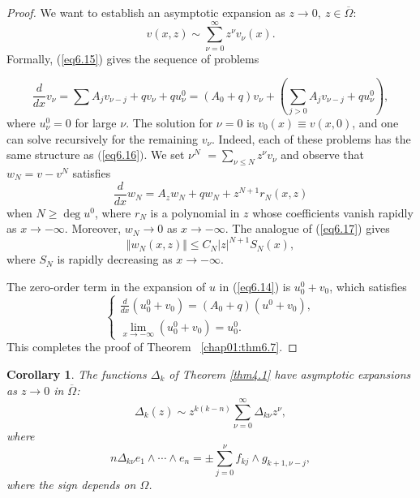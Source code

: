 \documentclass{surv-l}
\theoremstyle{plain}
\newtheorem{cor}[theorem]{Corollary}
\theoremstyle{definition}
\numberwithin{equation}{chapter}
\begin{document}
\begin{proof}
We want to establish an asymptotic expansion as $z\rightarrow 0,\ z\in\overline{\Omega}$:
\begin{equation}\label{eq6.18}
v(x, z)\sim\sum_{\nu=0}^{\infty}z^{\nu}v_{\nu}(x).
\end{equation}
Formally, (\ref{eq6.15}) gives the sequence of problems

\begin{equation}\label{eq6.19}
\displaystyle \frac{d}{dx}v_{\nu}=\sum A_{j}v_{\nu-j}+qv_{\nu} +qu_{\nu}^{0}=(A_{0}+q)v_{\nu}+\left(\sum_{j>0}A_{j}v_{\nu-j}+qu_{\nu}^{0}\right),
\end{equation}
where $u_{\nu}^{0}=0$ for large $\nu$. The solution for $\nu=0$ is
$v_{0}(x)\equiv v(x, 0)$, and one can solve recursively for the
remaining $v_{\nu}$. Indeed, each of these problems has the same
structure as $($\ref{eq6.16}$)$. We set $\nu^{N}$ $=\sum_{\nu\leq N}z^{\nu}v_{\nu}$ and observe that $w_{N}=v-v^{N}$ satisfies
\begin{equation*}
\frac{d}{dx}w_{N}=A_{z}w_{N}+qw_{N}+z^{N+1}r_{N}(x,z)
\end{equation*}
when $N\geq\deg u^{0}$, where $r_{N}$ is a polynomial in $z$ whose coefficients vanish rapidly as $ x\rightarrow-\infty$. Moreover, $w_{N}\rightarrow 0$ as $ x\rightarrow-\infty$. The analogue of (\ref{eq6.17}) gives
\begin{equation}\label{eq6.20}
\Vert w_{N}(x,z)\Vert\leq C_{N}|z|^{N+1}S_{N}(x),
\end{equation}
where $S_{N}$ is rapidly decreasing as $ x\rightarrow-\infty$.

The zero-order term in the expansion of $u$ in (\ref{eq6.14}) is $u_{0}^{0}+v_{0}$, which satisfies
\begin{equation*}
\left\{\begin{array}{l}
\frac{d}{dx}(u_{0}^{0}+v_{0})=(A_{0}+q)(u^{0}+v_{0}),\\
\lim_{x\rightarrow-\infty}(u_{0}^{0}+v_{0})=u_{0}^{0}.
\end{array}\right.
\end{equation*}
This completes the proof of Theorem ~\ref{chap01:thm6.7}.
\end{proof}
\setcounter{theorem}{20}
\begin{cor}\label{chap01:coro6.21}
The functions $\Delta_{k}$ of Theorem \emph{\ref{thm4.1}} have asymptotic expansions as $z\rightarrow 0$ in $\overline{\Omega}$\emph{:}
\setcounter{equation}{21}
\begin{equation}\label{eq6.22}
\Delta_{k}(z)\sim z^{k(k-n)}\sum_{\nu=0}^{\infty}\Delta_{k\nu}z^{\nu},
\end{equation}
where
\begin{equation}\label{eq6.23}
n\Delta_{k\nu}e_{1}\wedge\cdots\wedge e_{n}=\pm\sum_{j=0}^{\nu}f_{kj}\wedge g_{k+1,\nu-j},
\end{equation}
where the sign depends on $\Omega$.
\end{cor}
\end{document}
